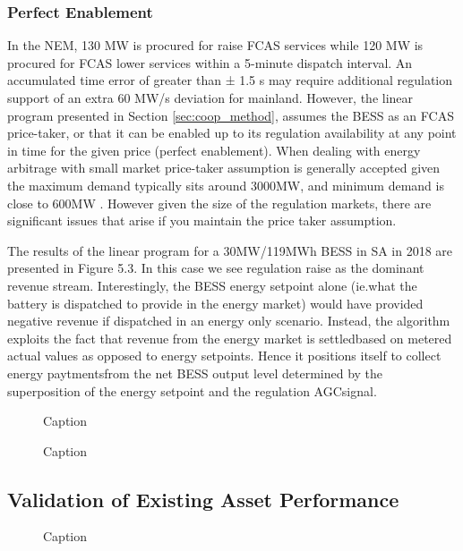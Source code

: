\subsubsection{Perfect Enablement}
In the NEM, 130 MW is procured for raise FCAS services while 120 MW is procured for FCAS lower services within a 5-minute dispatch interval. An accumulated time error of greater than ± 1.5 s may require additional regulation support of an extra 60 MW/s deviation for mainland. However, the linear program presented  in  Section  \ref{sec:coop_method},  assumes  the  BESS  as  an  FCAS  price-taker,  or  that  it  can  be  enabled  up  to its regulation availability at any point in time for the given price (perfect enablement). When dealing with energy arbitrage with small market price-taker assumption is generally accepted given the maximum demand typically sits around 3000MW, and minimum demand is close to 600MW \parencite{sa_aemo}. However given the size of the regulation markets, there are significant issues that arise if you maintain the price taker assumption. 

The results of the linear program for a 30MW/119MWh BESS in SA in 2018 are presented in Figure 5.3.  In this case we see regulation raise as the dominant revenue stream.  Interestingly,  the BESS energy setpoint alone (ie.what the battery is dispatched to provide in the energy market) would have provided negative revenue if dispatched in an energy only scenario.  Instead, the algorithm exploits the fact that revenue from the energy market is settledbased on metered actual values as opposed to energy setpoints.  Hence it positions itself to collect energy paytmentsfrom the net BESS output level determined by the superposition of the energy setpoint and the regulation AGCsignal.

\begin{figure}[H]
    \centering
    \caption{Caption}
    \label{fig:my_label}
\end{figure}

\begin{figure}[H]
    \centering
    \caption{Caption}
    \label{fig:my_label}
\end{figure}

\subsection{ Validation of Existing Asset Performance  }
\begin{figure}[H]
    \centering
    \caption{Caption}
    \label{fig:my_label}
\end{figure}